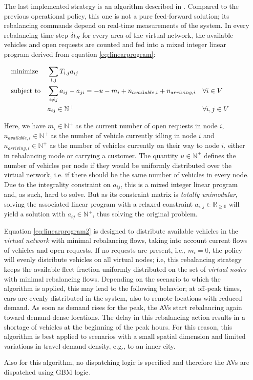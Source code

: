 The last implemented strategy is an algorithm described in \cite{pavone2011load}. Compared to the previous operational policy, this one is not a pure feed-forward solution; its rebalancing commands depend on real-time measurements of the system. In every rebalancing time step $\delta t_R$ for every area of the virtual network, the available vehicles and open requests are counted and fed into a mixed integer linear program derived from equation \ref{eq:linearprogram}:

\begin{align}
&\textnormal{minimize}& &\sum_{i,j} T_{i,j} a_{ij} & && && \nonumber \\
&\textnormal{subject to}&
&\sum_{i \neq j} a_{ij} - a_{ji} = -u - m_i + n_{available,i} + n_{arriving,i}
& &\forall i \in V &\label{eq:linearprogram2} \\
&& &a_{ij} \in \mathbb{N}^+& & \forall i, j \in V& \nonumber
\end{align}

Here, we have $m_i \in \mathbb{N}^+$ as the current number of open requests in node $i$, $n_{available,i} \in \mathbb{N}^+$ as the number of vehicle currently idling in node $i$ and $n_{arriving,i} \in \mathbb{N}^+$ as the number of vehicles currently on their way to node $i$, either in rebalancing mode or carrying a customer. The quantity $u \in \mathbb{N}^+$ defines the number of vehicles per node if they would be uniformly distributed over the virtual network, i.e. if  there should be the same number of vehicles in every node. Due to the integrality constraint on $a_{ij}$, this is a mixed integer linear program and, as such, hard to solve. But as its constraint matrix is \textit{totally unimodular}, solving the associated linear program with a relaxed constraint $a_{i,j} \in \mathbb{R}_{\geq 0}$ will yield a solution with $a_{ij} \in \mathbb{N}^+$, thus solving the original problem.


Equation \ref{eq:linearprogram2} is designed to distribute available vehicles in the \textit{virtual network} with minimal rebalancing flows, taking into account current flows of vehicles and open requests. If no requests are present, i.e., $m_i = 0$, the policy will evenly distribute vehicles on all virtual nodes; i.e, this rebalancing strategy keeps the available fleet fraction uniformly distributed on the set of \textit{virtual nodes} with minimal rebalancing flows. Depending on the scenario to which the algorithm is applied, this may lead to the following behavior; at off-peak times, cars are evenly distributed in the system, also to remote locations with reduced demand. As soon as demand rises for the peak, the AVs start rebalancing again toward demand-dense locations. The delay in this rebalancing action results in a shortage of vehicles at the beginning of the peak hours. For this reason, this algorithm is best applied to scenarios with a small
spatial dimension and limited variations in travel demand density, e.g., to an inner city.


Also for this algorithm, no dispatching logic is specified and therefore the AVs are dispatched using GBM logic.